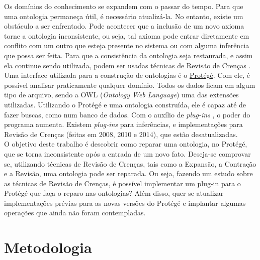 \documentclass[12pt,letterpaper]{article}
\begin{document}
	Os domínios do conhecimento se expandem com o passar do tempo. Para que uma ontologia permaneça útil, é necessário atualizá-la. No entanto, existe um obstáculo a ser enfrentado. Pode acontecer que a inclusão de um novo axioma torne a ontologia inconsistente, ou seja, tal axioma pode entrar diretamente em conflito com um outro que esteja presente no sistema ou com alguma inferência que possa ser feita. Para que a consistência da ontologia seja restaurada, e assim ela continue sendo utilizada, podem ser usadas técnicas de Revisão de Crenças\cite{gardenfors2003belief} \cite{gardenfors1992belief}. \\
	
	Uma interface utilizada para a construção de ontologias é o \href{https://protege.stanford.edu/}{Protégé}. Com ele, é possível analisar praticamente qualquer domínio. Todos os dados ficam em algum tipo de arquivo, sendo a OWL (\textit{Ontology Web Language}) uma das extensões utilizadas. Utilizando o Protégé e uma ontologia construída, ele é capaz até de fazer buscas, como num banco de dados. Com o auxílio de \textit{plug-ins} \cite{resina2014belief} \cite{ribeiro2008}, o poder do programa aumenta. Existem \textit{plug-ins} para inferências, e implementações para Revisão de Crenças (feitas em 2008, 2010 e 2014), que estão desatualizadas. \\ 
	
	O objetivo deste trabalho é descobrir como reparar uma ontologia, no Protégé, que se torna inconsistente após a entrada de um novo fato. Deseja-se comprovar se, utilizando técnicas de Revisão de Crenças, tais como a Expansão, a Contração e a Revisão, uma ontologia pode ser reparada. Ou seja, fazendo um estudo sobre as técnicas de Revisão de Crenças, é possível implementar um plug-in para o Protégé que faça o reparo nas ontologias? Além disso, quer-se atualizar implementações prévias para as novas versões do Protégé e implantar algumas operações que ainda não foram contempladas.  \\
	
	\clearpage
	
	\section{Metodologia}
	
\end{document}

